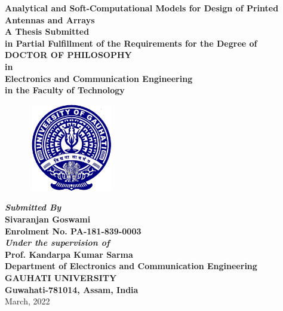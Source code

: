 \begin{titlepage}
\begin{center}
{\Large \bf Analytical and Soft-Computational Models for Design of Printed Antennas and Arrays} \\ [5ex]


{\normalsize{ \textbf{A Thesis Submitted \\in
 Partial Fulfillment of the Requirements for the Degree of \\\large \bf
DOCTOR OF PHILOSOPHY\\
in \\
Electronics and Communication Engineering \\
in the Faculty of Technology}}}\\
[6ex]

\begin{figure}[h]
\centering
\includegraphics[width=1.5in,height=1.5in]{clogoe.eps}\\
\end{figure}

{\sl \textbf{Submitted By}} \\[2ex]
{\sf \sf \textbf{Sivaranjan Goswami\\
Enrolment No. PA-181-839-0003}}\\[4ex]
{\sl \textbf{Under the supervision of}} \\[2ex]
{\sf \sf \textbf{Prof. Kandarpa Kumar Sarma}}\\ [6ex]


\vspace{0.5in}
{\large \bf Department of Electronics and Communication Engineering}  \\[1ex]
{\large \bf{GAUHATI UNIVERSITY}} \\[1ex]
{\large \bf{Guwahati-781014, Assam, India}} \\[1ex]
{\normalsize March, 2022 }
\end{center}
\end{titlepage}
